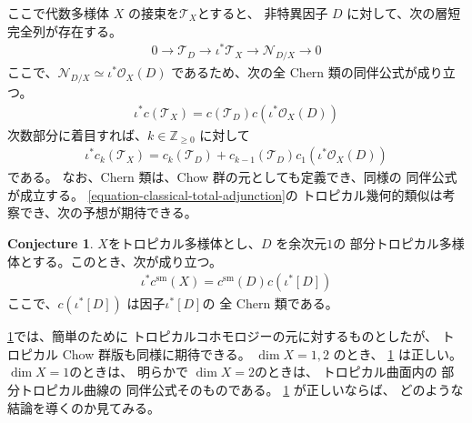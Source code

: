 \documentclass[a4paper,dvipdfmx,reqno,12pt]{amsart}
\theoremstyle{definition}
\newtheorem{conjecture}[theorem]{Conjecture}
\numberwithin{equation}{section}
\begin{document}
ここで代数多様体 $X$ の接束を$\mathcal{T}_X$とすると、
非特異因子 $D$ に対して、次の層短完全列が存在する。
\begin{align}
0 \to \mathcal{T}_{D}\to \iota^{*}\mathcal{T}_X
\to \mathcal{N}_{D/X}\to 0
\end{align}
ここで、$\mathcal{N}_{D/X}\simeq \iota^{*}\mathcal{O}_X(D)$
であるため、次の全 Chern 類の同伴公式が成り立つ。
\begin{align}
\label{equation-classical-total-adjunction}
\iota^{*}c(\mathcal{T}_X)
=c(\mathcal{T}_{D})c(\iota^{*}\mathcal{O}_X(D))
\end{align}
次数部分に着目すれば、$k\in \mathbb{Z}_{\geq 0}$
に対して
\begin{align}
\label{equation-classical-total-adjunction}
\iota^{*}c_k(\mathcal{T}_X)
=c_{k}(\mathcal{T}_{D})+
c_{k-1}(\mathcal{T}_{D})c_1(\iota^{*}\mathcal{O}_X(D))
\end{align}
である。
なお、Chern 類は、Chow 群の元としても定義でき、同様の
同伴公式が成立する。
\eqref{equation-classical-total-adjunction}の
トロピカル幾何的類似は考察でき、次の予想が期待できる。
\begin{conjecture}
\label{conjecture-grr-divisor}
$X$をトロピカル多様体とし、$D$ を余次元$1$の
部分トロピカル多様体とする。このとき、次が成り立つ。
\begin{align}
\label{equation-total-adjunction}
\iota^{*}c^{\mathrm{sm}}(X)=c^{\mathrm{sm}}(D)c(\iota^{*}[D])
\end{align}
ここで、$c(\iota^{*}[D])$ は因子$\iota^{*}[D]$の
全 Chern 類である。 
\end{conjecture}
\cref{conjecture-grr-divisor}では、簡単のために
トロピカルコホモロジーの元に対するものとしたが、
トロピカル Chow 群版も同様に期待できる。
$\dim X=1,2$ のとき、
\cref{conjecture-grr-divisor}
は正しい。$\dim X=1$のときは、
明らかで $\dim X=2$のときは、
トロピカル曲面内の
部分トロピカル曲線の
同伴公式そのものである\cite[Theorem 6]{shaw2015tropical}。
\cref{conjecture-grr-divisor} 
が正しいならば、
どのような結論を導くのか見てみる。
\end{document}
